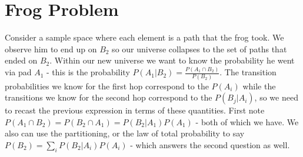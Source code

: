 \section{Frog Problem}
Consider a sample space where each element is a path that the frog took. We observe him to end up on $B_2$ so our universe collapses to the set of paths that ended on $B_2$. Within our new universe we want to know the probability he went via pad $A_1$ - this is the probability $P(A_1|B_2)=\frac{P(A_1\cap B_2)}{P(B_2)}$. The transition probabilities we know for the first hop correspond to the $P(A_i)$ while the transitions we know for the second hop correspond to the $P(B_j|A_i)$, so we need to recast the previous expression in terms of these quantities. First note $P(A_1\cap B_2)=P(B_2\cap A_1)=P(B_2|A_1)P(A_1)$ - both of which we have. We also can use the partitioning, or the law of total probability to say $P(B_2) =\sum_i P(B_2|A_i)P(A_i)$ - which answers the second question as well. 

